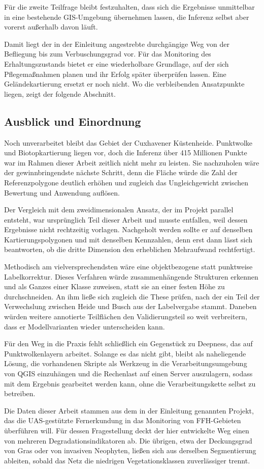 Für die zweite Teilfrage bleibt festzuhalten, dass sich die Ergebnisse
unmittelbar in eine bestehende GIS-Umgebung übernehmen lassen, die Inferenz
selbst aber vorerst außerhalb davon läuft.

Damit liegt der in der Einleitung angestrebte durchgängige Weg von der
Befliegung bis zum Verbuschungsgrad vor. Für das Monitoring des
Erhaltungszustands bietet er eine wiederholbare Grundlage, auf der sich
Pflegemaßnahmen planen und ihr Erfolg später überprüfen lassen. Eine
Geländekartierung ersetzt er noch nicht. Wo die verbleibenden Ansatzpunkte liegen, zeigt der folgende Abschnitt.

\subsection{Ausblick und Einordnung}\label{ausblick_teil}

Noch unverarbeitet bleibt das Gebiet der Cuxhavener Küstenheide. Punktwolke und Biotopkartierung liegen vor, doch die Inferenz über 415 Millionen Punkte war im Rahmen dieser Arbeit zeitlich nicht mehr zu leisten. Sie nachzuholen wäre der gewinnbringendste nächste Schritt, denn die Fläche würde die Zahl der Referenzpolygone deutlich erhöhen und zugleich das Ungleichgewicht zwischen Bewertung und Anwendung auflösen.

Der Vergleich mit dem zweidimensionalen Ansatz, der im Projekt parallel entsteht, war ursprünglich Teil dieser Arbeit und musste entfallen, weil dessen Ergebnisse nicht rechtzeitig vorlagen. Nachgeholt werden sollte er auf denselben Kartierungspolygonen und mit denselben Kennzahlen, denn erst dann lässt sich beantworten, ob die dritte Dimension den erheblichen Mehraufwand rechtfertigt.

Methodisch am vielversprechendsten wäre eine objektbezogene statt punktweise Labelkorrektur. Dieses Verfahren würde zusammenhängende Strukturen erkennen und als Ganzes einer Klasse zuweisen, statt sie an einer festen Höhe zu durchschneiden. An ihm ließe sich zugleich die These prüfen, nach der ein Teil der Verwechslung zwischen Heide und Busch aus der Labelvergabe stammt. Daneben würden weitere annotierte Teilflächen den Validierungsteil so weit verbreitern, dass er Modellvarianten wieder unterscheiden kann.

Für den Weg in die Praxis fehlt schließlich ein Gegenstück zu Deepness, das auf Punktwolkenlayern arbeitet. Solange es das nicht gibt, bleibt als naheliegende Lösung, die vorhandenen Skripte als Werkzeug in die Verarbeitungsumgebung von QGIS einzuhängen und die Rechenlast auf einen Server auszulagern, sodass mit dem Ergebnis gearbeitet werden kann, ohne die Verarbeitungskette selbst zu betreiben.

Die Daten dieser Arbeit stammen aus dem in der Einleitung genannten Projekt, das die UAS-gestützte Fernerkundung in das Monitoring von FFH-Gebieten überführen will. Für dessen Fragestellung deckt der hier entwickelte Weg einen von mehreren Degradationsindikatoren ab. Die übrigen, etwa der Deckungsgrad von Gras oder von invasiven Neophyten, ließen sich aus derselben Segmentierung ableiten, sobald das Netz die niedrigen Vegetationsklassen zuverlässiger trennt.

